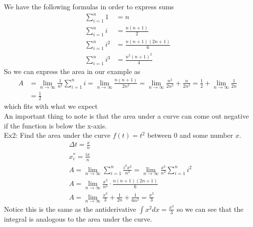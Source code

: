\documentclass[11pt, fleqn]{article}
\begin{document}
We have the following formulas in order to express sums
\begin{align*}
    \sum_{i=1}^n1&=n\\
    \sum_{i=1}^ni&=\frac{n(n+1)}{2}\\
    \sum_{i=1}^ni^2&=\frac{n(n+1)(2n+1)}{6}\\
    \sum_{i=1}^ni^3&=\frac{n^2(n+1)^2}{4}
\end{align*}
So we can express the area in our example as
\begin{align*}
    A&=\lim_{n\to\infty}\frac{1}{n^2}\sum_{i=1}^ni=\lim_{n\to\infty}\frac{n(n+1)}{2n^2}=\lim_{n\to\infty}\frac{n^2}{2n^2}+\frac{n}{2n^2}=\frac{1}{2}+\lim_{n\to\infty}\frac{1}{2n}\\
    &=\frac{1}{2}
\end{align*}
which fits with what we expect\\
An important thing to note is that the area under a curve can come out negative if the function is below the x-axis.\\
Ex2: Find the area under the curve $f(t)=t^2$ between 0 and some number $x$.
\begin{align*}
    &\Delta t=\frac{x}{n}\\
    &x_i^*=\frac{ix}{n}\\
    &A=\lim_{n\to\infty}\sum_{i=1}^n\frac{i^2x^3}{n^3}=\lim_{n\to\infty}\frac{x^3}{n^3}\sum_{i=1}^ni^2\\
    &A=\lim_{n\to\infty}\frac{x^3}{n^3}\cdot\frac{n(n+1)(2n+1)}{6}\\
    &A=\lim_{n\to\infty}\frac{x^3}{3}+\frac{1}{2n}+\frac{1}{6n^2}=\frac{x^3}{3}
\end{align*}
Notice this is the same as the antiderivative $\int x^2dx=\frac{x^3}{3}$ so we can see that the integral is analogous to the area under the curve.\\
\end{document}
